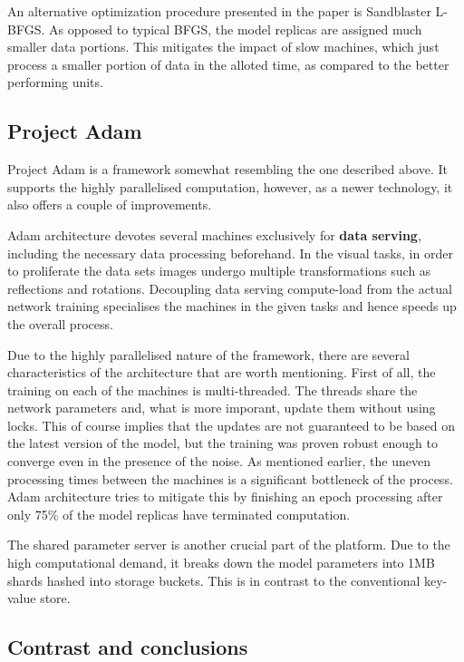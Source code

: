 \documentclass[a4paper, 11pt]{article}
\numberwithin{equation}{section}
\begin{document}
	An alternative optimization procedure presented in the paper is Sandblaster L-BFGS. As opposed to typical BFGS, the model replicas are assigned much smaller data portions. This mitigates the impact of slow machines, which just process a smaller portion of data in the alloted time, as compared to the better performing units.		 
	
	\subsection{Project Adam}
	
	Project Adam is a framework somewhat resembling the one described above. It supports the highly parallelised computation, however, as a newer technology, it also offers a couple of improvements.
	
	Adam architecture devotes several machines exclusively for \textbf{data serving}, including the necessary data processing beforehand. In the visual tasks, in order to proliferate the data sets images undergo multiple transformations such as reflections and rotations. Decoupling data serving compute-load from the actual network training specialises the machines in the given tasks and hence speeds up the overall process.
	
	Due to the highly parallelised nature of the framework, there are several characteristics of the architecture that are worth mentioning. First of all, the training on each of the machines is multi-threaded. The threads share the network parameters and, what is more imporant, update them without using locks. This of course implies that the updates are not guaranteed to be based on the latest version of the model, but the training was proven robust enough to converge even in the presence of the noise. As mentioned earlier, the uneven processing times between the machines is a significant bottleneck of the process. Adam architecture tries to mitigate this by finishing an epoch processing after only 75\% of the model replicas have terminated computation.
	
	The shared parameter server is another crucial part of the platform. Due to the high computational demand, it breaks down the model parameters into 1MB shards hashed into storage buckets. This is in contrast to the conventional key-value store.
	
	\subsection{Contrast and conclusions}
	
\end{document}

